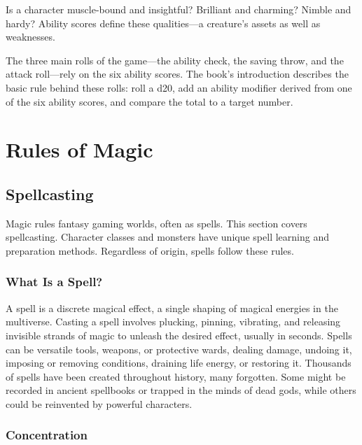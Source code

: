 Is a character muscle-bound and insightful? Brilliant and charming?
Nimble and hardy? Ability scores define these qualities---\hspace{0pt}a
creature's assets as well as weaknesses.

The three main rolls of the game---\hspace{0pt}the ability check, the
saving throw, and the attack roll---\hspace{0pt}rely on the six ability
scores. The book's introduction describes the basic rule behind these
rolls: roll a d20, add an ability modifier derived from one of the six
ability scores, and compare the total to a target number.

\section{Rules of Magic}\label{PlayersGuide_rules-of-magic}

\subsection{Spellcasting}\label{About_Spellcasting_spellcasting}

Magic rules fantasy gaming worlds, often as spells. This section covers
spellcasting. Character classes and monsters have unique spell learning
and preparation methods. Regardless of origin, spells follow these
rules.

\subsubsection{What Is a
Spell?}\label{About_Spellcasting_what-is-a-spell}

A spell is a discrete magical effect, a single shaping of magical
energies in the multiverse. Casting a spell involves plucking, pinning,
vibrating, and releasing invisible strands of magic to unleash the
desired effect, usually in seconds. Spells can be versatile tools,
weapons, or protective wards, dealing damage, undoing it, imposing or
removing conditions, draining life energy, or restoring it. Thousands of
spells have been created throughout history, many forgotten. Some might
be recorded in ancient spellbooks or trapped in the minds of dead gods,
while others could be reinvented by powerful characters.

\subsubsection{Concentration}\label{About_Spellcasting_concentration}

